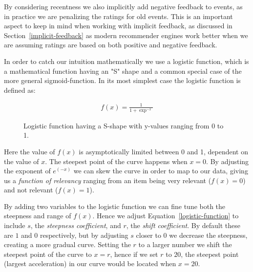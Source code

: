 By considering recentness we also implicitly add negative feedback to events,
as in practice we are penalizing the ratings for old events. This is an
important aspect to keep in mind when working with implicit feedback, as
discussed in Section~\ref{implicit-feedback} as modern recommender engines work
better when we are assuming ratings are based on both positive and negative
feedback.

In order to catch our intuition mathematically we use a logistic function, which
is a mathematical function having an "S" shape and a common special case of the
more general sigmoid-function. In its most simplest case the logistic function
is defined as:

\begin{figure}[H]
  \centering
  \noindent\begin{minipage}{.45\textwidth}
  \end{minipage}
  \begin{minipage}{.45\textwidth}
  \begin{align}
    \label{logistic-function}
    f(x) = \frac{1}{1+\exp^{-x}}
  \end{align}
  \end{minipage}
  \caption{Logistic function having a S-shape with y-values ranging
  from 0 to 1.}
\end{figure}

Here the value of $f(x)$ is asymptotically limited between 0 and 1, dependent
on the value of $x$. The steepest point of the curve happens when $x=0$. By
adjusting the exponent of $e^(-x)$ we can skew the curve in order to map to our
data, giving us a \textit{function of relevancy} ranging from an item being
very relevant ($f(x)=0$) and not relevant ($f(x)=1$).

By adding two variables to the logistic function we can fine tune both the
steepness and range of $f(x)$. Hence we adjust Equation~\ref{logistic-function}
to include $s$, the \textit{steepness coefficient}, and $r$, the \textit{shift
coefficient}. By default these are $1$ and $0$ respectively, but by adjusting
$s$ closer to 0 we decrease the steepness, creating a more gradual curve.
Setting the $r$ to a larger number we shift the steepest point of the curve to
$x=r$, hence if we set $r$ to $20$, the steepest point (largest acceleration)
in our curve would be located when $x=20$.

